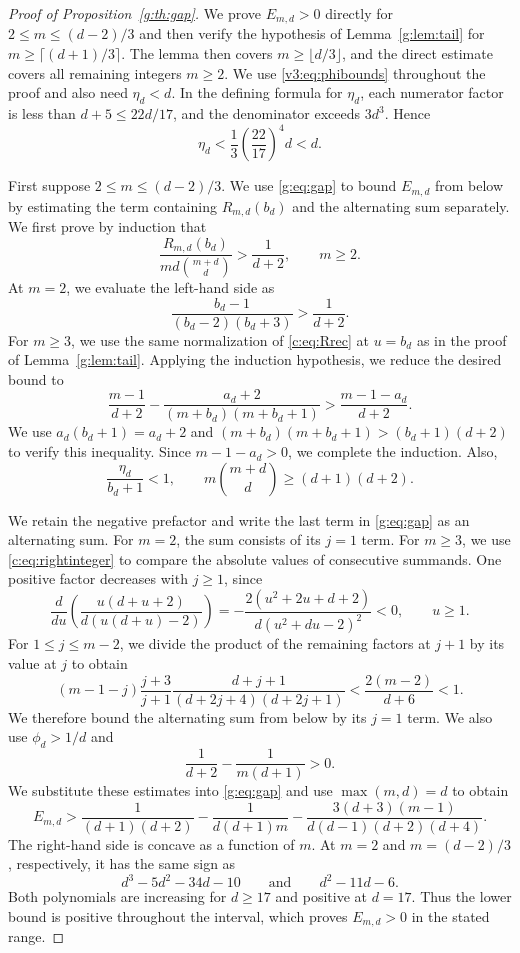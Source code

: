 \documentclass[10pt,a4paper]{article}
\numberwithin{equation}{section}
\theoremstyle{remark}\newtheorem{remark}[theorem]{Remark}
\begin{document}
\begin{proof}[Proof of Proposition~\ref{g:th:gap}]
We prove $E_{m,d}>0$ directly for $2\le m\le(d-2)/3$ and then verify
the hypothesis of Lemma~\ref{g:lem:tail} for $m\ge\lceil(d+1)/3\rceil$.
The lemma then covers $m\ge\lfloor d/3\rfloor$, and the direct estimate
covers all remaining integers $m\ge2$.
We use \eqref{v3:eq:phibounds} throughout the proof and also need $\eta_d<d$.
In the defining formula for $\eta_d$, each numerator factor is less
than $d+5\le22d/17$, and the denominator exceeds $3d^3$. Hence
\[
 \eta_d<\frac13\left(\frac{22}{17}\right)^4d<d.
\]

First suppose $2\le m\le(d-2)/3$.
We use \eqref{g:eq:gap} to bound $E_{m,d}$ from below by estimating
the term containing $R_{m,d}(b_d)$ and the alternating sum separately.
We first prove by induction that
\[
 \frac{R_{m,d}(b_d)}{md\binom{m+d}{d}}>\frac1{d+2},\qquad m\ge2.
\]
At $m=2$, we evaluate the left-hand side as
\[
 \frac{b_d-1}{(b_d-2)(b_d+3)}>\frac1{d+2}.
\]
For $m\ge3$, we use the same normalization of \eqref{c:eq:Rrec} at
$u=b_d$ as in the proof of Lemma~\ref{g:lem:tail}.
Applying the induction hypothesis, we reduce the desired bound to
\[
 \frac{m-1}{d+2}-\frac{a_d+2}{(m+b_d)(m+b_d+1)}
 >\frac{m-1-a_d}{d+2}.
\]
We use $a_d(b_d+1)=a_d+2$ and
$(m+b_d)(m+b_d+1)>(b_d+1)(d+2)$ to verify this inequality.
Since $m-1-a_d>0$, we complete the induction.
Also,
\[
 \frac{\eta_d}{b_d+1}<1,\qquad
 m\binom{m+d}{d}\ge(d+1)(d+2).
\]

We retain the negative prefactor and write the last term in
\eqref{g:eq:gap} as an alternating sum.
For $m=2$, the sum consists of its $j=1$ term.
For $m\ge3$, we use \eqref{c:eq:rightinteger} to compare the absolute
values of consecutive summands. One positive factor decreases with
$j\ge1$, since
\[
 \frac{d}{du}\left(\frac{u(d+u+2)}{d(u(d+u)-2)}\right)
 =-\frac{2(u^2+2u+d+2)}{d(u^2+du-2)^2}<0,\qquad u\ge1.
\]
For $1\le j\le m-2$, we divide the product of the remaining factors
at $j+1$ by its value at $j$ to obtain
\[
 (m-1-j)\frac{j+3}{j+1}
 \frac{d+j+1}{(d+2j+4)(d+2j+1)}
 <\frac{2(m-2)}{d+6}<1.
\]
We therefore bound the alternating sum from below by its $j=1$ term.
We also use $\phi_d>1/d$ and
\[
 \frac1{d+2}-\frac1{m(d+1)}>0.
\]
We substitute these estimates into \eqref{g:eq:gap} and use
$\max(m,d)=d$ to obtain
\[
 E_{m,d}>\frac1{(d+1)(d+2)}-\frac1{d(d+1)m}
 -\frac{3(d+3)(m-1)}{d(d-1)(d+2)(d+4)}.
\]
The right-hand side is concave as a function of $m$.
At $m=2$ and $m=(d-2)/3$, respectively, it has the same sign as
\[
 d^3-5d^2-34d-10
 \qquad\text{and}\qquad d^2-11d-6.
\]
Both polynomials are increasing for $d\ge17$ and positive at $d=17$.
Thus the lower bound is positive throughout the interval, which proves
$E_{m,d}>0$ in the stated range.


\end{proof}
\end{document}
